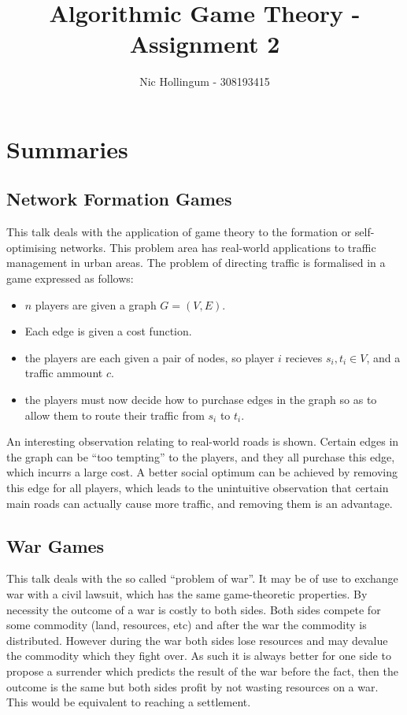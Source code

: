\documentclass{article}
\author{Nic Hollingum - 308193415}
\title{Algorithmic Game Theory - Assignment 2}
\begin{document}
\maketitle

\section {Summaries}
\subsection{Network Formation Games}
This talk deals with the application of game theory to the formation or self-optimising networks.
This problem area has real-world applications to traffic management in urban areas.
The problem of directing traffic is formalised in a game expressed as follows:
\begin{itemize}
	\item $n$ players are given a graph $G = (V, E)$.
	\item Each edge is given a cost function.
	\item the players are each given a pair of nodes, so player $i$ recieves $s_i, t_i \in V$, and a traffic ammount $c$.
	\item the players must now decide how to purchase edges in the graph so as to allow them to route their traffic from $s_i$ to $t_i$.
\end{itemize}

An interesting observation relating to real-world roads is shown.
Certain edges in the graph can be ``too tempting'' to the players, and they all purchase this edge, which incurrs a large cost.
A better social optimum can be achieved by removing this edge for all players, which leads to the unintuitive observation that certain main roads can actually cause more traffic, and removing them is an advantage.

\subsection{War Games}

This talk deals with the so called ``problem of war''.
It may be of use to exchange war with a civil lawsuit, which has the same game-theoretic properties.
By necessity the outcome of a war is costly to both sides.
Both sides compete for some commodity (land, resources, etc) and after the war the commodity is distributed.
However during the war both sides lose resources and may devalue the commodity which they fight over.
As such it is always better for one side to propose a surrender which predicts the result of the war before the fact, then the outcome is the same but both sides profit by not wasting resources on a war.
This would be equivalent to reaching a settlement.
\end{document}

